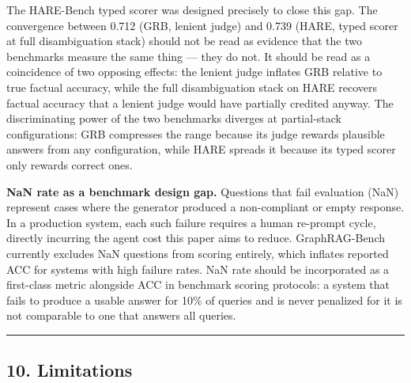 The HARE-Bench typed scorer was designed precisely to close this gap. The convergence between 0.712 (GRB, lenient judge) and 0.739 (HARE, typed scorer at full disambiguation stack) should not be read as evidence that the two benchmarks measure the same thing --- they do not. It should be read as a coincidence of two opposing effects: the lenient judge inflates GRB relative to true factual accuracy, while the full disambiguation stack on HARE recovers factual accuracy that a lenient judge would have partially credited anyway. The discriminating power of the two benchmarks diverges at partial-stack configurations: GRB compresses the range because its judge rewards plausible answers from any configuration, while HARE spreads it because its typed scorer only rewards correct ones.

\textbf{NaN rate as a benchmark design gap.} Questions that fail evaluation (NaN) represent cases where the generator produced a non-compliant or empty response. In a production system, each such failure requires a human re-prompt cycle, directly incurring the agent cost this paper aims to reduce. GraphRAG-Bench currently excludes NaN questions from scoring entirely, which inflates reported ACC for systems with high failure rates. NaN rate should be incorporated as a first-class metric alongside ACC in benchmark scoring protocols: a system that fails to produce a usable answer for 10\% of queries and is never penalized for it is not comparable to one that answers all queries.

\begin{center}\rule{0.5\linewidth}{0.5pt}\end{center}

\subsection{10. Limitations}\label{limitations}

